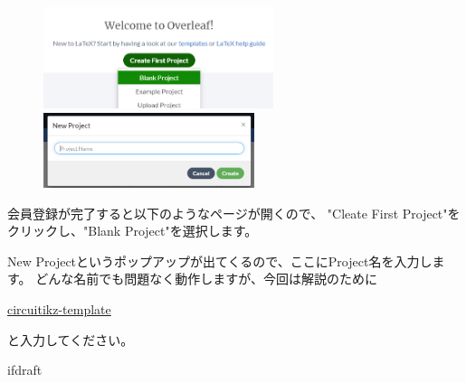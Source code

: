		\newpage
		\begin{figure}
			\centering

			\includegraphics[width=0.6\textwidth]{figure/overleaf-page-createproject.png}

			\vspace{3mm}

			\begin{flushright}
				\includegraphics[width=0.55\textwidth]{figure/overleaf-page-projectname.png}
			\end{flushright}
		\end{figure}
		会員登録が完了すると以下のようなページが開くので、
		"Cleate First Project"をクリックし、"Blank Project"を選択します。
		
		New Projectというポップアップが出てくるので、ここにProject名を入力します。
		どんな名前でも問題なく動作しますが、今回は解説のために
		\begin{mdframed}[style=shadow]
			\url{circuitikz-template}
		\end{mdframed}\vspace{-3mm}
		と入力してください。
		

\expandafter\ifx\csname ifdraft\endcsname\relax
	
\fi